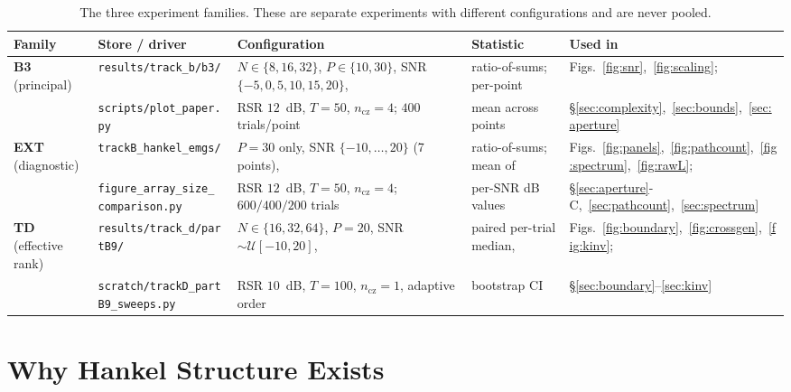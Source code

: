 \documentclass[journal]{IEEEtran}
\begin{document}
\begin{table}[!t]
\caption{The three experiment families. These are separate experiments with
different configurations and are never pooled.}
\label{tab:config}
\centering
\scriptsize
\setlength{\tabcolsep}{2pt}
\begin{tabular}{lllll}
\toprule
Family & Store / driver & Configuration & Statistic & Used in \\
\midrule
\textbf{B3} (principal) & \texttt{results/track\_b/b3/} &
$N\in\{8,16,32\}$, $P\in\{10,30\}$, SNR $\{-5,0,5,10,15,20\}$, &
ratio-of-sums; per-point & Figs.~\ref{fig:snr},~\ref{fig:scaling}; \\
 & \texttt{scripts/plot\_paper.py} &
RSR $12$~dB, $T=50$, $n_{\mathrm{cz}}=4$; $400$ trials/point &
mean across points & \S\ref{sec:complexity},~\ref{sec:bounds},~\ref{sec:aperture} \\[1pt]
\textbf{EXT} (diagnostic) & \texttt{trackB\_hankel\_emgs/} &
$P=30$ only, SNR $\{-10,\dots,20\}$ (7 points), &
ratio-of-sums; mean of & Figs.~\ref{fig:panels},~\ref{fig:pathcount},~\ref{fig:spectrum},~\ref{fig:rawL}; \\
 & \shortstack[l]{\texttt{figure\_array\_size\_}\\\texttt{comparison.py}} &
RSR $12$~dB, $T=50$, $n_{\mathrm{cz}}=4$; $600/400/200$ trials &
per-SNR dB values & \S\ref{sec:aperture}-C,~\ref{sec:pathcount},~\ref{sec:spectrum} \\[2pt]
\textbf{TD} (effective rank) & \texttt{results/track\_d/partB9/} &
$N\in\{16,32,64\}$, $P=20$, SNR $\sim\mathcal{U}[-10,20]$, &
paired per-trial median, & Figs.~\ref{fig:boundary},~\ref{fig:crossgen},~\ref{fig:kinv}; \\
 & \texttt{scratch/trackD\_partB9\_sweeps.py} &
RSR $10$~dB, $T=100$, $n_{\mathrm{cz}}=1$, adaptive order &
bootstrap CI & \S\ref{sec:boundary}--\ref{sec:kinv} \\
\bottomrule
\end{tabular}
\end{table}

\section{Why Hankel Structure Exists}\label{sec:hankel}
\end{document}

